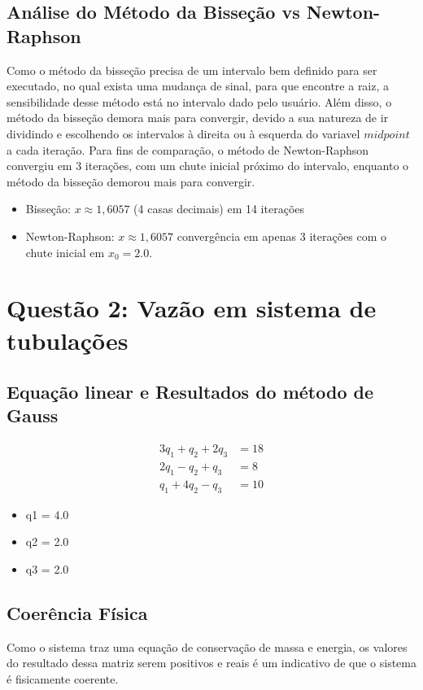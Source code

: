 \documentclass{article}
\begin{document}
\subsection*{Análise do Método da Bisseção vs Newton-Raphson}
Como o método da bisseção precisa de um intervalo bem definido para ser executado, no qual exista uma mudança de sinal, para que encontre a raiz, a sensibilidade desse método está no intervalo dado pelo usuário. Além disso, o método da bisseção demora mais para convergir, devido a sua natureza
de ir dividindo e escolhendo os intervalos à direita ou à esquerda do variavel $midpoint$ a cada iteração. Para fins de comparação, o método de Newton-Raphson convergiu em 3 iterações, com um chute inicial próximo do intervalo, enquanto o método da bisseção demorou mais para convergir.
\begin{itemize}
\item Bisseção: $x \approx 1,\!6057$ (4 casas decimais) em 14 iterações 
\item Newton-Raphson: $x \approx 1,\!6057$ convergência em apenas 3 iterações com o chute inicial em $x_0 = 2.0$.
\end{itemize}



\section*{Questão 2: Vazão em sistema de tubulações}
\subsection*{Equação linear e Resultados do método de Gauss}
\begin{align*}
3q_1 + q_2 + 2q_3 &= 18 \\
2q_1 - q_2 + q_3 &= 8 \\
q_1 + 4q_2 - q_3 &= 10
\end{align*}

\begin{itemize}
\item q1 = 4.0
\item q2 = 2.0
\item q3 = 2.0
\end{itemize}


\subsection*{Coerência Física}
Como o sistema traz uma equação de conservação de massa e energia, os valores do resultado dessa matriz serem positivos e reais é um indicativo de que o sistema é fisicamente coerente.
\end{document}
